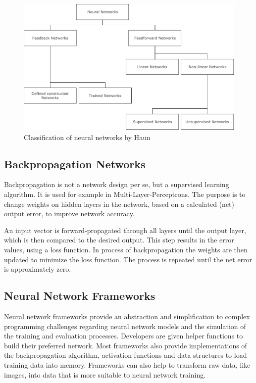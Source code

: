 \begin{figure}
\centering
\includegraphics[width=15.00000cm]{images/nn_classification}
\caption{Classification of neural networks by Haun
\cite{haun1998simulation} \label{nn_class_haun}}
\end{figure}

\subsection{Backpropagation Networks}\label{backpropagation-networks}

Backpropagation is not a network design per se, but a supervised
learning algorithm. It is used for example in Multi-Layer-Perceptrons.
The purpose is to change weights on hidden layers in the network, based
on a calculated (net) output error, to improve network accuracy.
\cite{nn-froehlich}

An input vector is forward-propagated through all layers until the
output layer, which is then compared to the desired output. This step
results in the error values, using a loss function. In process of
backpropagation the weights are then updated to minimize the loss
function. The process is repeated until the net error is approximately
zero. \cite{nn-froehlich}

\subsection{Neural Network Frameworks}\label{neural-network-frameworks}

Neural network frameworks provide an abstraction and simplification to
complex programming challenges \cite{dzone-frameworks} regarding neural
network models and the simulation of the training and evaluation
processes. Developers are given helper functions to build their
preferred network. Most frameworks also provide implementations of the
backpropagation algorithm, activation functions and data structures to
load training data into memory. Frameworks can also help to transform
raw data, like images, into data that is more suitable to neural network
training.

